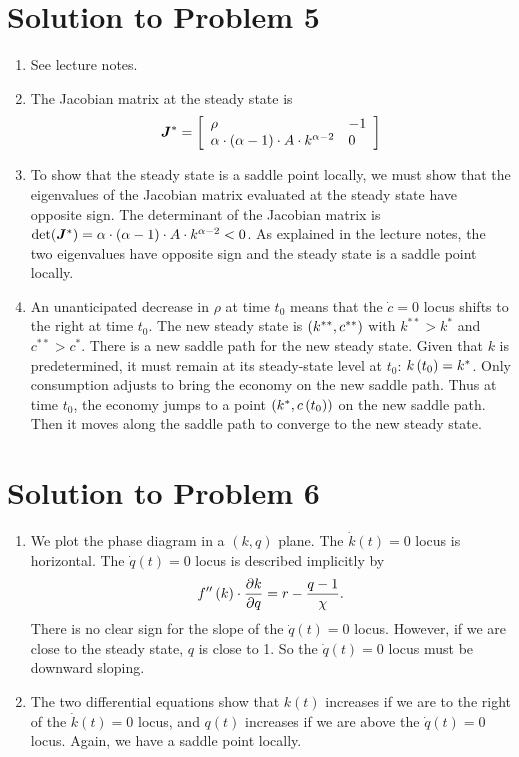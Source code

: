 \documentclass[letterpaper,12pt,leqno]{article}
\begin{document}
\section*{Solution to Problem 5}
\begin{enumerate}
\item See lecture notes.
\item  The Jacobian matrix at the steady state is
\begin{align*}
\bm{J}^{*}=\left[ 
\begin{array}{ll}
\rho  & -1 \\ 
\alpha \cdot \left( \alpha -1 \right)\cdot  A\cdot k^{\alpha -2} & 0
\end{array} \right] 
\end{align*}
\item To show that the steady state is a saddle point locally, we must show that the eigenvalues of the Jacobian matrix evaluated at the steady state have opposite sign. The determinant of the Jacobian matrix is  $\det(\bm{J}^{*}) =\alpha\cdot  \left( \alpha -1 \right)\cdot A\cdot k^{\alpha -2}<0$. As explained in the lecture notes, the two eigenvalues have opposite sign and the steady state is a saddle point locally.

\item An unanticipated decrease in $\rho $ at time $t_{0}$ means that the $\dot{c}=0$ locus shifts to the right at time $t_{0}$. The new steady state is $\left( k^{**},c^{**} \right) $ with $k^{* *}>k^*$ and $c^{* *}>c^*$. There is a new saddle path for the new steady state. Given that $k$ is predetermined, it must remain at its steady-state level at $t_{0}$: $k\left( t_{0} \right) =k^*$. Only consumption adjusts to bring the economy on the new saddle path. Thus at time $t_{0}$, the economy jumps to a point $\left( k^*,c\left( t_{0} \right) \right)$ on the new saddle path. Then it moves along the saddle path to converge to the new steady state.
\end{enumerate}

\section*{Solution to Problem 6}
\begin{enumerate}
\item We plot the phase diagram in a $(k,q)$ plane. The $\dot{k}(t)=0$ locus is horizontal. The $\dot{q}(t)=0$ locus is described implicitly by
\begin{align*}
f''\left( k \right) \cdot \frac{\partial k}{\partial q}=r-\frac{q-1}{\chi}.
\end{align*}
There is no clear sign for the slope of the $\dot{q}(t)=0$ locus. However, if we are close to the steady state,  $q$ is close to 1. So the $\dot{q}(t)=0$ locus must be downward sloping.
\item The two differential equations show that $k(t)$ increases if we are to the right of the $\dot{k}(t)=0$ locus, and $q(t)$ increases if we are above the $\dot{q}(t)=0$ locus. Again, we have a saddle point locally.
\end{enumerate}
\end{document}
